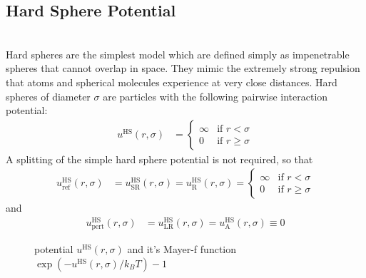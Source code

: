 \newpage
\subsection{Hard Sphere Potential}
~\\

Hard spheres are the simplest model which are defined simply as impenetrable spheres that cannot overlap
in space. They mimic the extremely strong repulsion that atoms and spherical molecules
experience at very close distances.
Hard spheres of diameter $\sigma$ are particles with the following pairwise interaction potential:
\begin{align}
u^\text{HS}(r,\sigma) &=
\begin{cases}
\infty  & \mbox{if } r <    \sigma \\
0       & \mbox{if } r \geq \sigma
\end{cases}
\end{align}
A splitting of the simple hard sphere potential is not required, so that
\begin{align}
u^\text{HS}_\text{ref}(r,\sigma) &= u^\text{HS}_\text{SR}(r,\sigma) = u^\text{HS}_\text{R}(r,\sigma) =
\begin{cases}
\infty  & \mbox{if } r <    \sigma \\
0       & \mbox{if } r \geq \sigma
\end{cases}
\end{align}
and
\begin{align}
u^\text{HS}_\text{pert}(r,\sigma) &= u^\text{HS}_\text{LR}(r,\sigma) = u^\text{HS}_\text{A}(r,\sigma) \equiv 0
\end{align}

\begin{figure}[htb]
\centering
  \quad
  \caption{potential $u^\text{HS}(r,\sigma)$ and it's Mayer-f function $\exp(-u^\text{HS}(r,\sigma)/k_BT)-1$}
\end{figure}

